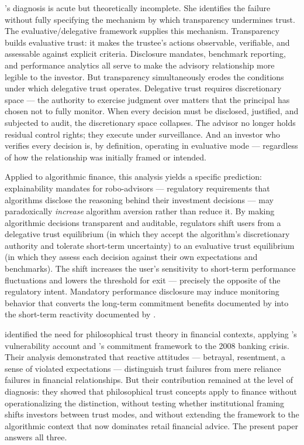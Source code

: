 \citeauthor{ONeill2002}'s diagnosis is acute but theoretically incomplete. She identifies the failure without fully specifying the mechanism by which transparency undermines trust. The evaluative/delegative framework supplies this mechanism. Transparency builds evaluative trust: it makes the trustee's actions observable, verifiable, and assessable against explicit criteria. Disclosure mandates, benchmark reporting, and performance analytics all serve to make the advisory relationship more legible to the investor. But transparency simultaneously erodes the conditions under which delegative trust operates. Delegative trust requires discretionary space --- the authority to exercise judgment over matters that the principal has chosen not to fully monitor. When every decision must be disclosed, justified, and subjected to audit, the discretionary space collapses. The advisor no longer holds residual control rights; they execute under surveillance. And an investor who verifies every decision is, by definition, operating in evaluative mode --- regardless of how the relationship was initially framed or intended.

Applied to algorithmic finance, this analysis yields a specific prediction: explainability mandates for robo-advisors --- regulatory requirements that algorithms disclose the reasoning behind their investment decisions --- may paradoxically \textit{increase} algorithm aversion rather than reduce it. By making algorithmic decisions transparent and auditable, regulators shift users from a delegative trust equilibrium (in which they accept the algorithm's discretionary authority and tolerate short-term uncertainty) to an evaluative trust equilibrium (in which they assess each decision against their own expectations and benchmarks). The shift increases the user's sensitivity to short-term performance fluctuations and lowers the threshold for exit --- precisely the opposite of the regulatory intent. Mandatory performance disclosure may induce monitoring behavior that converts the long-term commitment benefits documented by \citet{GennaioliShleiferVishny2015} into the short-term reactivity documented by \citet{DietvorstSimmonsMassey2015}.

\citet{CarterSpencerSimion2020} identified the need for philosophical trust theory in financial contexts, applying \citeauthor{Baier1986}'s vulnerability account and \citeauthor{Hawley2014}'s commitment framework to the 2008 banking crisis. Their analysis demonstrated that reactive attitudes --- betrayal, resentment, a sense of violated expectations --- distinguish trust failures from mere reliance failures in financial relationships. But their contribution remained at the level of diagnosis: they showed that philosophical trust concepts apply to finance without operationalizing the distinction, without testing whether institutional framing shifts investors between trust modes, and without extending the framework to the algorithmic context that now dominates retail financial advice. The present paper answers all three.

